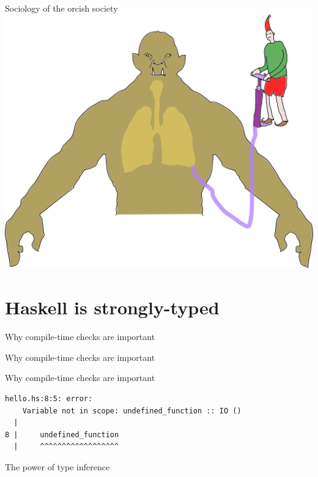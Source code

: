 \documentclass{beamer}
\begin{document}
\begin{frame}{Sociology of the orcish society}
	\includegraphics[scale=0.65]{assets/images/complete.png}
\end{frame}
	

\section{Haskell is strongly-typed}

\begin{frame}{Why compile-time checks are important}
	
\end{frame}

\begin{frame}{Why compile-time checks are important}
	
\end{frame}

\begin{frame}[fragile]{Why compile-time checks are important}
\begin{verbatim}
hello.hs:8:5: error:
    Variable not in scope: undefined_function :: IO ()
  |
8 |     undefined_function
  |     ^^^^^^^^^^^^^^^^^^
\end{verbatim}
\end{frame}

\begin{frame}{The power of type inference}
	


\end{frame}
\end{document}
